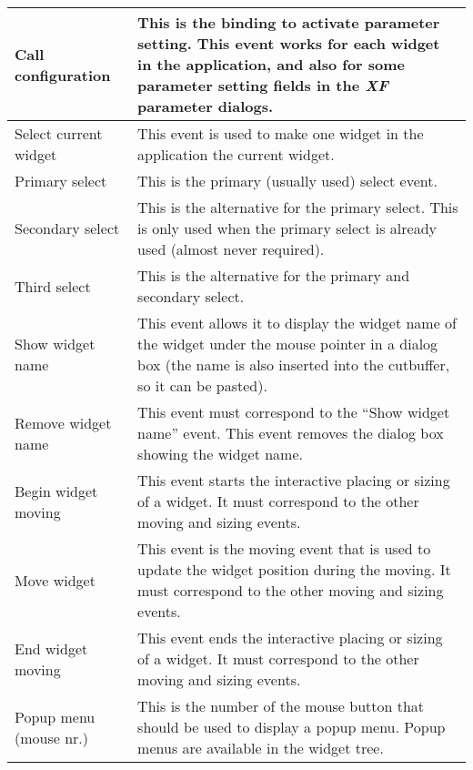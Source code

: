 {\newpage
\clearpage
\samepage \begin{supertabular}{|l|p{6.8cm}|}
Call configuration     & This is the binding to activate
                         parameter setting. This event works
                         for each widget in the application,
                         and also for some parameter setting
                         fields in the {\em XF }
 parameter
                         dialogs.\\  \hline
Select current widget  & This event is used to make one
                         widget in the application the
                         current widget.\\  \hline
Primary select         & This is the primary (usually used)
                         select event.\\  \hline
Secondary select       & This is the alternative for the
                         primary select. This is only used
                         when the primary select is already
                         used (almost never required).\\  \hline
Third select           & This is the alternative for the
                         primary and secondary select.\\  \hline
Show widget name       & This event allows it to display
                         the widget name of the widget under
                         the mouse pointer in a dialog box
                         (the name is also inserted into the
                         cutbuffer, so it can be pasted).\\  \hline
Remove widget name     & This event must correspond to the
                         ``Show widget name'' event. This
                         event removes the dialog box
                         showing the widget name.\\  \hline
Begin widget moving    & This event starts the interactive
                         placing or sizing of a widget. It
                         must correspond to the other
                         moving and sizing events.\\  \hline
Move widget            & This event is the moving event that
                         is used to update the widget
                         position during the moving. It must
                         correspond to the other
                         moving and sizing events.\\  \hline
End widget moving      & This event ends the interactive
                         placing or sizing of a widget. It
                         must correspond to the other
                         moving and sizing events.\\  \hline
Popup menu (mouse nr.) & This is the number of the mouse
                         button that should be used to
                         display a popup menu. Popup menus
                         are available in the widget tree.\\ 
\end{supertabular}
}

